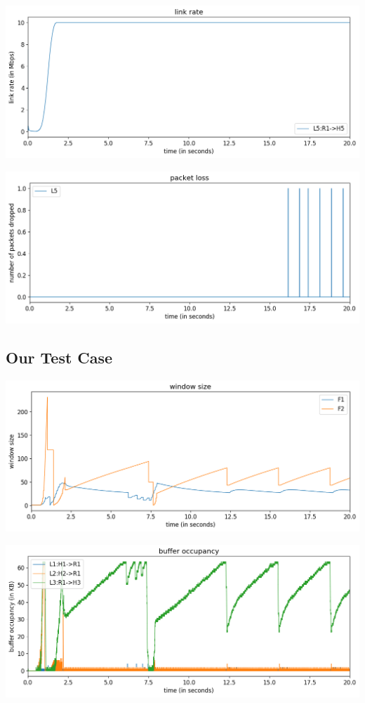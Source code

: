 \documentclass{article}
\begin{document}
\includegraphics[width = \textwidth]{"test_case5_fast link rate"}

\includegraphics[width = \textwidth]{"test_case5_fast packet loss"}





\subsection{Our Test Case}

\includegraphics[width = \textwidth]{"test_case_custom window size"}

\includegraphics[width = \textwidth]{"test_case_custom buffer occupancy"}
\end{document}
